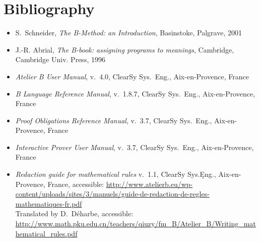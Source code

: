 \documentclass[12pt,journal,duplex]{IEEEtran}
\begin{document}
	\IEEEPARstart{}{}
	\newpage

\pagebreak
	\section*{Bibliography}
	\begin{itemize}
		\item
		S.~Schneider, \emph{The B-Method: an Introduction}, Basinstoke, Palgrave, 2001

		\item
		J.-R. Abrial, \emph{The B-book: assigning programs to meanings}, Cambridge, Cambridge Univ. Press, 1996

		\item
		\emph{Atelier B User Manual}, v.~4.0, ClearSy Sys.~Eng., Aix-en-Provence, France

		\item
		\emph{B Language Reference Manual}, v.~1.8.7, ClearSy Sys.~Eng., Aix-en-Provence, France

		\item
		\emph{Proof Obligations Reference Manual}, v.~3.7, ClearSy Sys.~Eng., Aix-en-Provence, France

		\item
		\emph{Interactive Prover User Manual}, v.~3.7, ClearSy Sys.~Eng., Aix-en-Provence, France

		\item
		\emph{Redaction guide for mathematical rules} v.~1.1, ClearSy Sys.Ęng., Aix-en-Provence, France, accessible: \url{http://www.atelierb.eu/wp-content/uploads/sites/3/manuels/guide-de-redaction-de-regles-mathematiques-fr.pdf}\\
		Translated by D.~D\'{e}harbe, accessible:
		\url{http://www.math.pku.edu.cn/teachers/qiuzy/fm_B/Atelier_B/Writing_mathematical_rules.pdf}
	\end{itemize}
\end{document}

